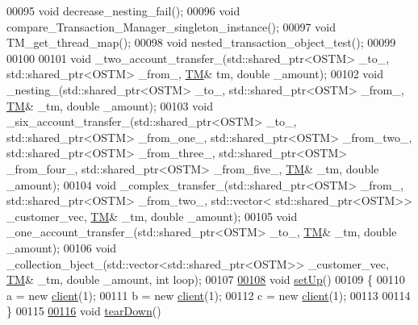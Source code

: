 \begin{DoxyCode}
00095     \textcolor{keywordtype}{void} decrease\_nesting\_fail();
00096     \textcolor{keywordtype}{void} compare\_Transaction\_Manager\_singleton\_instance();
00097     \textcolor{keywordtype}{void} TM\_get\_thread\_map();
00098     \textcolor{keywordtype}{void} nested\_transaction\_object\_test();
00099     
00100     
00101     \textcolor{keywordtype}{void} \_two\_account\_transfer\_(std::shared\_ptr<OSTM> \_to\_, std::shared\_ptr<OSTM> \_from\_, 
      \hyperlink{class_t_m}{TM}& tm, \textcolor{keywordtype}{double} \_amount);
00102     \textcolor{keywordtype}{void} \_nesting\_(std::shared\_ptr<OSTM> \_to\_, std::shared\_ptr<OSTM> \_from\_, \hyperlink{class_t_m}{TM}& \_tm, \textcolor{keywordtype}{double} \_amount);
00103     \textcolor{keywordtype}{void} \_six\_account\_transfer\_(std::shared\_ptr<OSTM> \_to\_, std::shared\_ptr<OSTM> \_from\_one\_, 
      std::shared\_ptr<OSTM> \_from\_two\_, std::shared\_ptr<OSTM> \_from\_three\_, std::shared\_ptr<OSTM> \_from\_four\_, 
      std::shared\_ptr<OSTM> \_from\_five\_, \hyperlink{class_t_m}{TM}& \_tm, \textcolor{keywordtype}{double} \_amount); 
00104     \textcolor{keywordtype}{void} \_complex\_transfer\_(std::shared\_ptr<OSTM> \_from\_, std::shared\_ptr<OSTM> \_from\_two\_, std::vector<
      std::shared\_ptr<OSTM>> \_customer\_vec, \hyperlink{class_t_m}{TM}& \_tm, \textcolor{keywordtype}{double} \_amount);
00105     \textcolor{keywordtype}{void} \_one\_account\_transfer\_(std::shared\_ptr<OSTM> \_to\_, \hyperlink{class_t_m}{TM}& \_tm, \textcolor{keywordtype}{double} \_amount);
00106     \textcolor{keywordtype}{void} \_collection\_bject\_(std::vector<std::shared\_ptr<OSTM>> \_customer\_vec, \hyperlink{class_t_m}{TM}& \_tm, \textcolor{keywordtype}{double} \_amount, \textcolor{keywordtype}{
      int} loop);
00107     
\hypertarget{_my_test_c_ase_8h_source.tex_l00108}{}\hyperlink{class_my_test_c_ase_a387cf3ea316c793a7b5f34418a2ee3d4_a387cf3ea316c793a7b5f34418a2ee3d4}{00108}   \textcolor{keywordtype}{void} \hyperlink{class_my_test_c_ase_a387cf3ea316c793a7b5f34418a2ee3d4_a387cf3ea316c793a7b5f34418a2ee3d4}{setUp}()
00109   \{
00110       a = \textcolor{keyword}{new} \hyperlink{classclient}{client}(1);
00111       b = \textcolor{keyword}{new} \hyperlink{classclient}{client}(1);
00112       c = \textcolor{keyword}{new} \hyperlink{classclient}{client}(1);
00113 
00114   \}
00115 
\hypertarget{_my_test_c_ase_8h_source.tex_l00116}{}\hyperlink{class_my_test_c_ase_aeb24ab2614834b9c3b02fd15d288ea0c_aeb24ab2614834b9c3b02fd15d288ea0c}{00116}   \textcolor{keywordtype}{void} \hyperlink{class_my_test_c_ase_aeb24ab2614834b9c3b02fd15d288ea0c_aeb24ab2614834b9c3b02fd15d288ea0c}{tearDown}() 

\end{DoxyCode}
